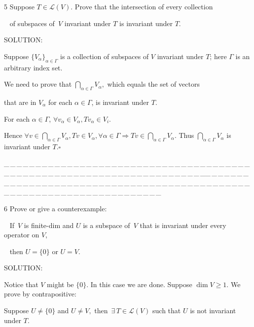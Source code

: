 \documentclass[a4paper, 11pt, UTF8]{article}
\def\Lm{\mathcal{L}}
\begin{document}
\begin{large}
{\timesbf\Large 5} {\timessl\Large 
Suppose $T\in\Lm(V)$. Prove that the intersection of every collection}\par\,\,\,
{\timessl\Large of subspaces of \,$V$ invariant under $T$ is invariant under $T$.
}\par
{\timesbf S\footnotesize{OLUTION:}}\par\quad
Suppose $\{V_\alpha\}_{\alpha\in\Gamma}$ is a collection of subspaces of $V$ invariant under $T$; here $\Gamma$ is an arbitrary index set.\par\quad
We need to prove that $\bigcap_{\alpha\in\Gamma}V_\alpha,$ which equals the set of vectors\par\qquad\qquad\qquad\qquad that are in $V_\alpha$ for each $\alpha\in\Gamma$, is invariant under $T$.\par\quad
For each $\alpha\in\Gamma$, $\forall v_\alpha\in V_\alpha,Tv_\alpha\in V_i.$\par\quad
Hence $\forall v\in \bigcap_{\alpha\in\Gamma}V_\alpha,Tv\in V_\alpha,\forall\alpha\in\Gamma\Rightarrow Tv\in\bigcap_{\alpha\in\Gamma}V_\alpha.$
Thus $\bigcap_{\alpha\in\Gamma}V_\alpha$ is invariant under $T$.\quad$\square$\par
{\tiny \_\,\_\,\_\,\_\,\_\,\_\,\_\,\_\,\_\,\_\,\_\,\_\,\_\,\_\,\_\,\_\,\_\,\_\,\_\,\_\,\_\,\_\,\_\,\_\,\_\,\_\,\_\,\_\,\_\,\_\,\_\,\_\,\_\,\_\,\_\,\_\,\_\,\_\,\_\,\_\,\_\,\_\,\_\,\_\,\_\,\_\,\_\,\_\,\_\,\_\,\_\,\_\,\_\,\_\,\_\,\_\,\_\,\_\,\_\,\_\,\_\,\_\,\_\,\_\,\_\,\_\,\_\,\_\,\_\,\_\,\_\_\,\_\,\_\,\_\,\_\,\_\,\_\,\_\,\_\,\_\,\_\,\_\,\_\,\_\,\_\,\_\,\_\,\_\,\_\,\_\,\_\,\_\,\_\,\_\,\_\,\_\,\_\,\_\,\_\,\_\,\_\,\_\,\_\,\_\,\_\,\_\,\_\,\_\,\_\,\_\,\_\,\_\,\_\,\_\,\_\,\_\,\_\,\_\,\_\,\_\,\_\,\_\,\_\,\_\,\_\,\_\,\_\,\_\,\_\,\_\,\_\,\_\,\_\,\_\,\_\,\_\,\_\,\_\,\_\,\_\,\_\par}
{\timesbf\Large 6} {\timessl\Large 
Prove or give a counterexample:}\par\,\,\,
{\timessl\Large If \,$V$ is finite-dim and $U$ is a subspace of \,$V$ that is invariant under every operator on $V$,}\par\,\,\,
{\timessl\Large then $U = \{0\}$ or $U = V$.
}\par
{\timesbf S\footnotesize{OLUTION:}}\par\quad
Notice that $V$ might be $\{0\}$. In this case we are done. Suppose $\dim V\geq 1.$ We prove by contrapositive:\par\qquad\quad
Suppose $U\neq\{0\}$ and $U\neq V,$ then $\,\exists\,T\in\Lm(V)$ such that $U$ is not invariant under $T$.\par\quad

\end{large}
\end{document}
